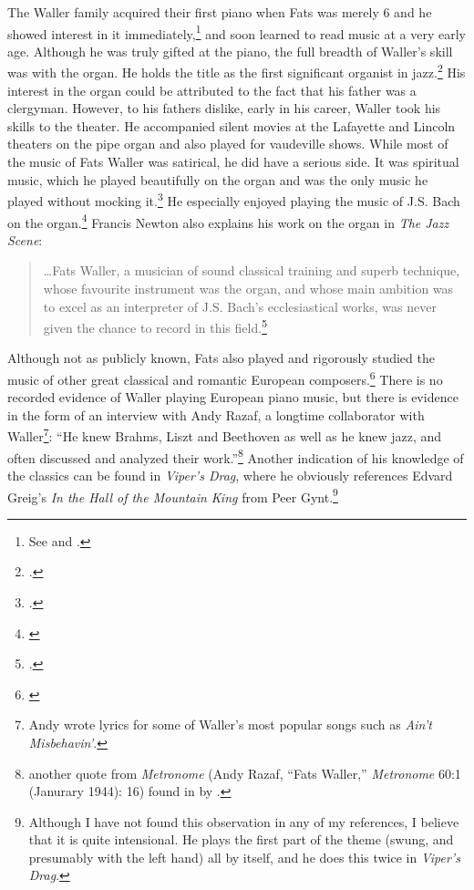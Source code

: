 \documentclass[11pt]{report}
\begin{document}
	\label{sec:organ_and_classical}
	The Waller family acquired their first piano when Fats was merely 6 and he showed interest in it immediately,\footnote{See \cite{transcriptions} and \cite{life}.} and soon learned to read music at a very early age. Although he was truly gifted at the piano, the full breadth of Waller's skill was with the organ. He holds the title as the first significant organist in jazz.\footnote{\cite[40]{grove-book:waller}.} His interest in the organ could be attributed to the fact that his father was a clergyman. However, to his fathers dislike, early in his career, Waller took his skills to the theater. He accompanied silent movies at the Lafayette and Lincoln theaters on the pipe organ and also played for vaudeville shows. While most of the music of Fats Waller was satirical, he did have a serious side. It was spiritual music, which he played beautifully on the organ and was the only music he played without mocking it.\footnote{\cite[8]{outside-insider}.} He especially enjoyed playing the music of J.S. Bach on the organ.\footnote{\cite[143]{visions}} Francis Newton also explains his work on the organ in \emph{The Jazz Scene}:

	\begin{quote}
		\ldots Fats Waller, a musician of sound classical training and superb technique, whose favourite instrument was the organ, and whose main ambition was to excel as an interpreter of J.S. Bach's ecclesiastical works, was never given the chance to record in this field.\footnote{\cite[209]{jazz_scene}.}
	\end{quote}
	
	Although not as publicly known, Fats also played and rigorously studied the music of other great classical and romantic European composers.\footnote{\cite[3]{life}} There is no recorded evidence of Waller playing European piano music, but there is evidence in the form of an interview with Andy Razaf, a longtime collaborator with Waller\footnote{Andy wrote lyrics for some of Waller's most popular songs such as \emph{Ain't Misbehavin'}.}: ``He knew Brahms, Liszt and Beethoven as well as he knew jazz, and often discussed and analyzed their work.''\footnote{another quote from \emph{Metronome} (Andy Razaf, ``Fats Waller,'' \emph{Metronome} 60:1 (Janurary 1944): 16) found in  by \cite{transcriptions}.} Another indication of his knowledge of the classics can be found in \emph{Viper's Drag}, where he obviously references Edvard Greig's \emph{In the Hall of the Mountain King} from Peer Gynt.\footnote{Although I have not found this observation in any of my references, I believe that it is quite intensional. He plays the first part of the theme (swung, and presumably with the left hand) all by itself, and he does this twice in \emph{Viper's Drag}.}
	
\end{document}
